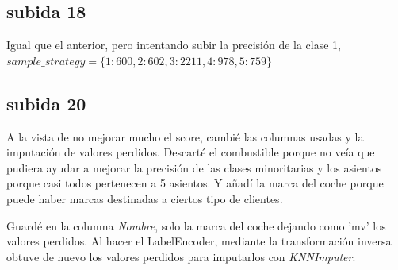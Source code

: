 \subsection{subida 18}

Igual que el anterior, pero intentando subir la precisión de la clase 1, $sample\_strategy=\{1: 600, 2: 602, 3: 2211, 4: 978, 5: 759\}$

\subsection{subida 20}

A la vista de no mejorar mucho el score, cambié las columnas usadas y la imputación de valores perdidos. Descarté el combustible porque no veía que pudiera ayudar a mejorar la precisión de las clases minoritarias y los asientos porque casi todos pertenecen a 5 asientos. Y añadí la marca del coche porque puede haber marcas destinadas a ciertos tipo de clientes.

Guardé en la columna \textit{Nombre}, solo la marca del coche dejando como 'mv' los valores perdidos. Al hacer el LabelEncoder, mediante la transformación inversa obtuve de nuevo los valores perdidos para imputarlos con \textit{KNNImputer}.